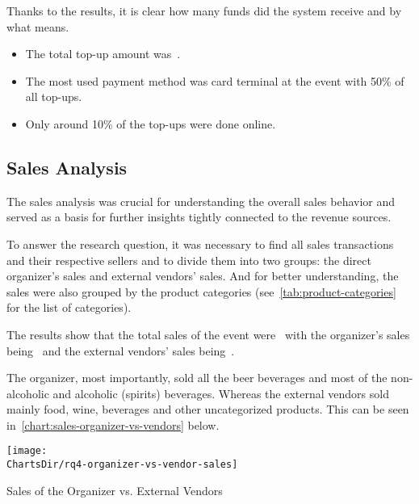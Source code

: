 Thanks to the results, it is clear how many funds did the system receive and by what means.

\begin{keytakeaways}
	\begin{itemize}
		\item The total top-up amount was~.
		\item The most used payment method was card terminal at the event with 50\% of all top-ups.
		\item Only around 10\% of the top-ups were done online.
	\end{itemize}
\end{keytakeaways}


\subsection{Sales Analysis}
\label{subsec:analysis-sales}


The sales analysis was crucial for understanding the overall sales behavior and served as a basis for further insights tightly connected to the revenue sources.

To answer the research question, it was necessary to find all sales transactions and their respective sellers and to divide them into two groups: the direct organizer's sales and external vendors' sales.
And for better understanding, the sales were also grouped by the product categories (see~\autoref{tab:product-categories} for the list of categories).

The results show that the total sales of the event were~ with the organizer's sales being~ and the external vendors' sales being~.

The organizer, most importantly, sold all the beer beverages and most of the non-alcoholic and alcoholic (spirits) beverages.
Whereas the external vendors sold mainly food, wine, beverages and other uncategorized products.
This can be seen in~\autoref{chart:sales-organizer-vs-vendors} below.

\begin{chart}[H]
	\centering
	\texttt{[image: \\ChartsDir/rq4-organizer-vs-vendor-sales]}
	\caption{ Sales of the Organizer vs. External Vendors}
	\label{chart:sales-organizer-vs-vendors}
	\source
\end{chart}


